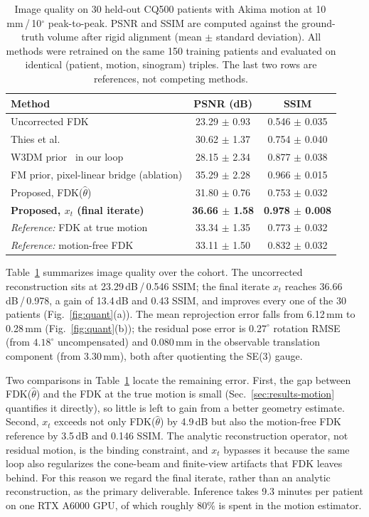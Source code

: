 \documentclass[11pt]{article}
\newcommand{\thetahat}{\hat\theta}
\begin{document}
\begin{table}[t]
\centering
\caption{Image quality on 30 held-out CQ500 patients with Akima motion at
10\,mm\,/\,10$^\circ$ peak-to-peak. PSNR and SSIM are computed against the ground-truth
volume after rigid alignment (mean $\pm$ standard deviation). All methods were retrained on
the same 150 training patients and evaluated on identical (patient, motion, sinogram)
triples. The last two rows are references, not competing methods.}
\label{tab:main}
\begin{tabular}{lcc}
\toprule
Method & PSNR (dB) & SSIM \\
\midrule
Uncorrected FDK & 23.29 $\pm$ 0.93 & 0.546 $\pm$ 0.035 \\
Thies et al.~\cite{thies25} & 30.62 $\pm$ 1.37 & 0.754 $\pm$ 0.040 \\
W3DM prior~\cite{depaepe25} in our loop & 28.15 $\pm$ 2.34 & 0.877 $\pm$ 0.038 \\
FM prior, pixel-linear bridge (ablation) & 35.29 $\pm$ 2.28 & 0.966 $\pm$ 0.015 \\
Proposed, FDK($\thetahat$) & 31.80 $\pm$ 0.76 & 0.753 $\pm$ 0.032 \\
\textbf{Proposed, $x_t$ (final iterate)} & \textbf{36.66 $\pm$ 1.58} & \textbf{0.978 $\pm$ 0.008} \\
\midrule
\emph{Reference:} FDK at true motion & 33.34 $\pm$ 1.35 & 0.773 $\pm$ 0.032 \\
\emph{Reference:} motion-free FDK & 33.11 $\pm$ 1.50 & 0.832 $\pm$ 0.032 \\
\bottomrule
\end{tabular}
\end{table}

Table~\ref{tab:main} summarizes image quality over the cohort. The uncorrected
reconstruction sits at 23.29\,dB\,/\,0.546 SSIM; the final iterate $x_t$ reaches
36.66\,dB\,/\,0.978, a gain of 13.4\,dB and 0.43 SSIM, and improves every one of the 30
patients (Fig.~\ref{fig:quant}(a)). The mean reprojection error falls from 6.12\,mm to
0.28\,mm (Fig.~\ref{fig:quant}(b)); the residual pose error is $0.27^\circ$ rotation RMSE
(from $4.18^\circ$ uncompensated) and 0.080\,mm in the observable translation component
(from 3.30\,mm), both after quotienting the SE(3) gauge.

Two comparisons in Table~\ref{tab:main} locate the remaining error. First, the gap between
FDK($\thetahat$) and the FDK at the true motion is small (Sec.~\ref{sec:results-motion}
quantifies it directly), so little is left to gain from a better geometry estimate. Second,
$x_t$ exceeds not only FDK($\thetahat$) by 4.9\,dB but also the motion-free FDK reference by
3.5\,dB and 0.146 SSIM. The analytic reconstruction operator, not residual motion, is the
binding constraint, and $x_t$ bypasses it because the same loop also regularizes the
cone-beam and finite-view artifacts that FDK leaves behind. For this reason we regard the
final iterate, rather than an analytic reconstruction, as the primary deliverable. Inference
takes 9.3 minutes per patient on one RTX A6000 GPU, of which roughly 80\% is spent in the
motion estimator.
\end{document}
